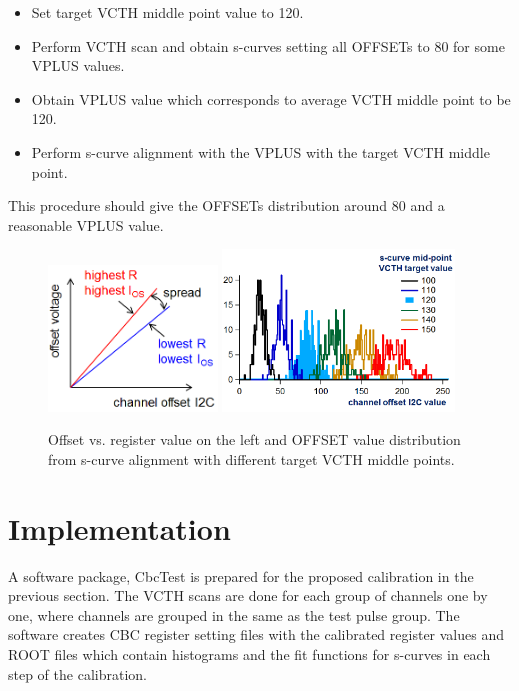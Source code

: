 \documentclass[11pt,a4paper]{article}
\begin{document}
	\begin{itemize}
	\item Set target VCTH middle point value to 120.
	\item Perform VCTH scan and obtain s-curves setting all OFFSETs to 80 for some VPLUS values.
	\item Obtain VPLUS value which corresponds to average VCTH middle point to be 120. 
	\item Perform s-curve alignment with the VPLUS with the target VCTH middle point.
	\end{itemize}

	This procedure should give the OFFSETs distribution around 80 and a reasonable VPLUS value.

	\begin{figure}[htbp]
	\centering
	\includegraphics[width=0.4\textwidth]{fig/OffsetI2c.png}
	\includegraphics[width=0.55\textwidth]{fig/VcthMidI2c.png}
	\caption{Offset vs. register value on the left and OFFSET value distribution from s-curve alignment with different target VCTH middle points. }\label{fig:offset-i2c}
	\end{figure}

	\section{Implementation}\label{ch:implementation}
	A software package, CbcTest is prepared for the proposed calibration in the previous section.
	The VCTH scans are done for each group of channels one by one, where channels are grouped in the same as the test pulse group.
	The software creates CBC register setting files with the calibrated register values and ROOT files which contain histograms 
	and the fit functions for s-curves in each step of the calibration.
\end{document}

